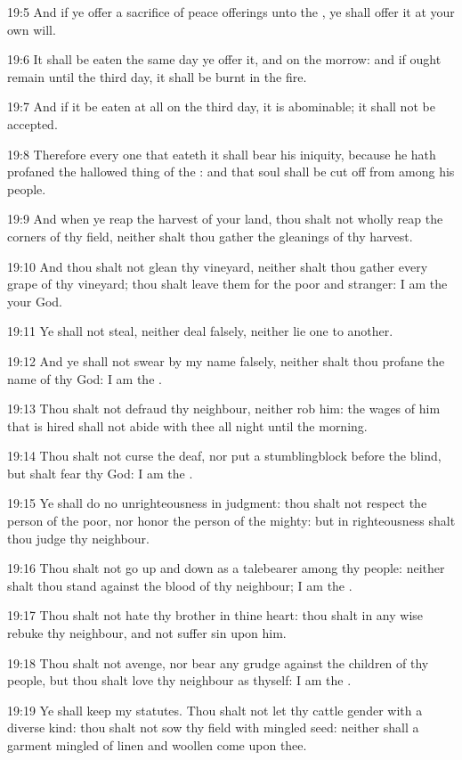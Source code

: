 19:5 And if ye offer a sacrifice of peace offerings unto the \LORD, ye shall offer it at your own will.

19:6 It shall be eaten the same day ye offer it, and on the morrow: and if ought remain until the third day, it shall be burnt in the fire.

19:7 And if it be eaten at all on the third day, it is abominable; it shall not be accepted.

19:8 Therefore every one that eateth it shall bear his iniquity, because he hath profaned the hallowed thing of the \LORD: and that soul shall be cut off from among his people.

19:9 And when ye reap the harvest of your land, thou shalt not wholly reap the corners of thy field, neither shalt thou gather the gleanings of thy harvest.

19:10 And thou shalt not glean thy vineyard, neither shalt thou gather every grape of thy vineyard; thou shalt leave them for the poor and stranger: I am the \LORD your God.

19:11 Ye shall not steal, neither deal falsely, neither lie one to another.

19:12 And ye shall not swear by my name falsely, neither shalt thou profane the name of thy God: I am the \LORD.

19:13 Thou shalt not defraud thy neighbour, neither rob him: the wages of him that is hired shall not abide with thee all night until the morning.

19:14 Thou shalt not curse the deaf, nor put a stumblingblock before the blind, but shalt fear thy God: I am the \LORD.

19:15 Ye shall do no unrighteousness in judgment: thou shalt not respect the person of the poor, nor honor the person of the mighty: but in righteousness shalt thou judge thy neighbour.

19:16 Thou shalt not go up and down as a talebearer among thy people: neither shalt thou stand against the blood of thy neighbour; I am the \LORD.

19:17 Thou shalt not hate thy brother in thine heart: thou shalt in any wise rebuke thy neighbour, and not suffer sin upon him.

19:18 Thou shalt not avenge, nor bear any grudge against the children of thy people, but thou shalt love thy neighbour as thyself: I am the \LORD.

19:19 Ye shall keep my statutes. Thou shalt not let thy cattle gender with a diverse kind: thou shalt not sow thy field with mingled seed: neither shall a garment mingled of linen and woollen come upon thee.

